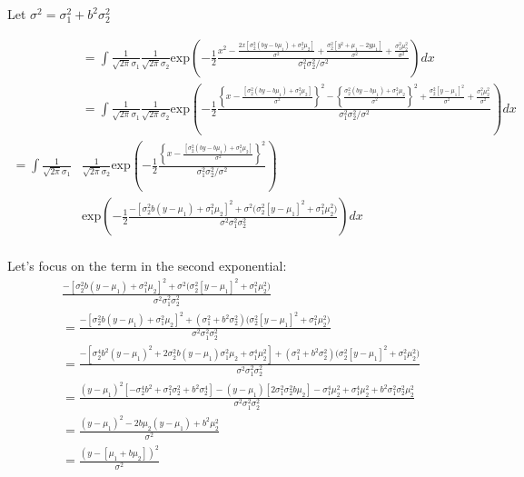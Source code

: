 \documentclass[11pt]{article}
\begin{document}
Let $\sigma^2 = \sigma^2_1+b^2\sigma^2_2$

\begin{align*}
 & = \int\frac{1}{\sqrt{2\pi}\sigma_1} \frac{1}{\sqrt{2\pi}\sigma_2} \text{exp}\left(-\frac{1}{2}\frac{x^2-\frac{2x[\sigma^2_2(by-b\mu_1)+\sigma^2_1\mu_2]}{{\sigma^2}} + \frac{ \sigma^2_2[y^2+\mu_1-2y\mu_1]}{{\sigma^2}}+\frac{\sigma^2_1\mu_2^2}{{\sigma^2}}}{\sigma^2_1\sigma^2_2/\sigma^2}\right)dx\\
 & =\int \frac{1}{\sqrt{2\pi}\sigma_1} \frac{1}{\sqrt{2\pi}\sigma_2} \text{exp}\left(-\frac{1}{2}\frac{\left\{x-\frac{[\sigma^2_2(by-b\mu_1)+\sigma^2_1\mu_2]}{{\sigma^2}}\right\}^2 -\left \{\frac{\sigma^2_2(by-b\mu_1)+\sigma^2_1\mu_2}{\sigma^2} \right \}^2 + \frac{ \sigma^2_2[y-\mu_1]^2}{{\sigma^2}}+\frac{\sigma^2_1\mu_2^2}{{\sigma^2}}}{\sigma^2_1\sigma^2_2/\sigma^2}\right)dx\\ 
 =\int \frac{1}{\sqrt{2\pi}\sigma_1}& \frac{1}{\sqrt{2\pi}\sigma_2} \text{exp}\left(-\frac{1}{2}\frac{\left\{x-\frac{[\sigma^2_2(by-b\mu_1)+\sigma^2_1\mu_2]}{{\sigma^2}}\right\}^2 }{\sigma^2_1\sigma^2_2/\sigma^2}\right) \\
 &\text{exp}\left(-\frac{1}{2}\frac{- [ \sigma^2_2b(y-\mu_1)+\sigma^2_1\mu_2]^2+ \sigma^2 (\sigma_2^2[y-\mu_1]^2+{\sigma^2_1\mu_2^2)}}{\sigma^2\sigma^2_1\sigma^2_2}\right)dx\\
\end{align*}


Let's focus on the term in the second exponential:
\begin{align*}
 &\frac{- [ \sigma^2_2b(y-\mu_1)+\sigma^2_1\mu_2]^2  + \sigma^2 (\sigma_2^2[y-\mu_1]^2+{\sigma^2_1\mu_2^2)}}{\sigma^2\sigma^2_1\sigma^2_2} \\ &= \frac{- [ \sigma^2_2b(y-\mu_1)+\sigma^2_1\mu_2]^2+ (\sigma^2_1+b^2 \sigma_2^2) (\sigma_2^2[y-\mu_1]^2+{\sigma^2_1\mu_2^2)}}{\sigma^2\sigma^2_1\sigma^2_2}\\
  &= \frac{- [ \sigma^4_2b^2(y-\mu_1)^2
  +2\sigma^2_2b(y-\mu_1)\sigma^2_1\mu_2+\sigma^4_1\mu_2^2]+ (\sigma^2_1+b^2 \sigma_2^2) (\sigma_2^2[y-\mu_1]^2+{\sigma^2_1\mu_2^2)}}{\sigma^2\sigma^2_1\sigma^2_2}\\
   &= \frac{(y-\mu_1)^2[-\sigma^4_2b^2+\sigma_1^2\sigma^2_2+b^2\sigma_2^4] - (y-\mu_1)[2\sigma_1^2\sigma_2^2b\mu_2]-\sigma_1^4\mu_2^2+\sigma_1^4\mu_2^2+b^2\sigma_1^2 \sigma_2^2\mu_2^2
}{\sigma^2\sigma^2_1\sigma^2_2}\\
   &= \frac{(y-\mu_1)^2 - 2b\mu_2(y-\mu_1)+b^2\mu_2^2
}{\sigma^2}\\
&= \frac{(y-[\mu_1+b\mu_2])^2 
}{\sigma^2}
\end{align*}
\end{document}
